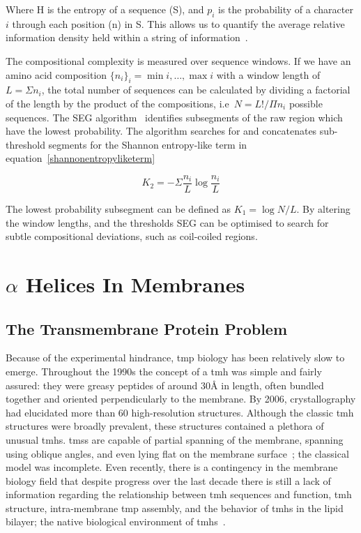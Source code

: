 Where H is the entropy of a sequence (S), and $p_i$ is the probability of a character $i$ through each position (n) in S. This allows us to quantify the average relative information density held within a string of information~\cite{Shannon1948}.

The compositional complexity is measured over sequence windows. If we have an amino acid composition $\{{{n}_{i}}{\}}_{i}={\min{i}},\ldots,{\max{i}}$ with a window length of $L=\Sigma {n}_i $, the total number of sequences can be calculated by dividing a factorial of the length by the product of the compositions, i.e\  $ N = L!/\Pi{n}_i $ possible sequences.
The SEG algorithm~\cite{WOOTTON1994269, Wootton1996} identifies subsegments of the raw region which have the lowest probability.
The algorithm searches for and concatenates sub-threshold segments for the Shannon entropy-like term in equation~\ref{shannonentropyliketerm}

\begin{equation} \label{shannonentropyliketerm}
{K}_{2}=-\Sigma\frac{n_i}{L}\log\frac{n_i}{L}
\end{equation}

The lowest probability subsegment can be defined as $ K_1=\log N/L $.
By altering the window lengths, and the thresholds SEG can be optimised to search for subtle compositional deviations, such as coil-coiled regions.

\section{$\alpha$ Helices In Membranes }

\subsection{The Transmembrane Protein Problem}
Because of the experimental hindrance, \gls{tmp} biology has been relatively slow to emerge.
Throughout the 1990s the concept of a \gls{tmh} was simple and fairly assured: they were greasy peptides of around 30{\AA} in length, often bundled together and oriented perpendicularly to the membrane.
By 2006, crystallography had elucidated more than 60 high-resolution structures.
Although the classic \gls{tmh} structures were broadly prevalent, these structures contained a plethora of unusual \gls{tmh}s.
\gls{tms}s are capable of partial spanning of the membrane, spanning using oblique angles, and even lying flat on the membrane surface~\cite{VonHeijne2006, Elofsson2007}; the classical model was incomplete.
Even recently, there is a contingency in the  membrane biology field that despite progress over the last decade there is still a lack of information regarding the relationship between \gls{tmh} sequences and function, \gls{tmh} structure, intra-membrane \gls{tmp} assembly, and the behavior of \gls{tmh}s in the lipid bilayer; the native biological environment of \gls{tmh}s~\cite{Ladokhin2015}.

